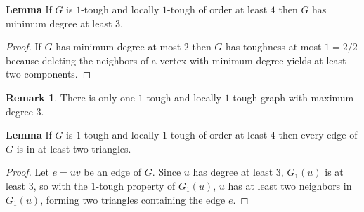 \documentclass{beamer}
\theoremstyle{plain}
\theoremstyle{definition}
\newtheorem{rem}[thm]{Remark}
\begin{document}
\begin{frame}{\bf Lemma}
If $G$ is $1$-tough and locally $1$-tough of order at least $4$ then $G$ has minimum degree at least $3$.
\bigskip

\begin{proof} If $G$ has minimum degree at most $2$ then $G$ has toughness at most $1=2/2$
because deleting the neighbors of a vertex with minimum degree yields at least two components.
\end{proof}


\begin{rem}
There is only one $1$-tough and locally $1$-tough graph with maximum degree $3$.
\end{rem}


\begin{center}
\end{center}

\end{frame}


\begin{frame}{\bf Lemma}
If $G$ is $1$-tough and locally $1$-tough of order at least $4$ then every edge of $G$ is in at least two triangles.
\bigskip

\begin{proof} Let $e=uv$ be an edge of $G$. Since $u$ has degree at least $3$, $G_1(u)$ is at least $3$, so with  the $1$-tough property of $G_1(u)$, $u$ has at least two neighbors in $G_1(u)$, forming two triangles containing the edge $e$.
\end{proof}
\end{frame}
\end{document}
